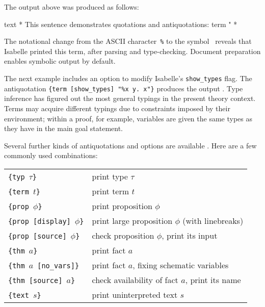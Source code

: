 \begin{isabellebody}
\begin{isamarkuptext}
  \medskip\noindent The output above was produced as follows:
  \begin{ttbox}
text {\ttlbrace}*
  This sentence demonstrates quotations and antiquotations:
  {\at}{\ttlbrace}term "%
*{\ttrbrace}
  \end{ttbox}\vspace{-\medskipamount}

  The notational change from the ASCII character~\verb,%, to the
  symbol~\isa{{\isasymlambda}} reveals that Isabelle printed this term, after
  parsing and type-checking.  Document preparation enables symbolic
  output by default.

  \medskip The next example includes an option to modify Isabelle's
  \verb,show_types, flag.  The antiquotation
  \texttt{{\at}}\verb,{term [show_types] "%x y. x"}, produces the
  output .  Type inference has figured
  out the most general typings in the present theory context.  Terms
  may acquire different typings due to constraints imposed by their
  environment; within a proof, for example, variables are given the
  same types as they have in the main goal statement.

  \medskip Several further kinds of antiquotations and options are
  available \cite{isabelle-sys}.  Here are a few commonly used
  combinations:

  \medskip

  \begin{tabular}{ll}
  \texttt{\at}\verb,{typ,~$\tau$\verb,}, & print type $\tau$ \\
  \texttt{\at}\verb,{term,~$t$\verb,}, & print term $t$ \\
  \texttt{\at}\verb,{prop,~$\phi$\verb,}, & print proposition $\phi$ \\
  \texttt{\at}\verb,{prop [display],~$\phi$\verb,}, & print large proposition $\phi$ (with linebreaks) \\
  \texttt{\at}\verb,{prop [source],~$\phi$\verb,}, & check proposition $\phi$, print its input \\
  \texttt{\at}\verb,{thm,~$a$\verb,}, & print fact $a$ \\
  \texttt{\at}\verb,{thm,~$a$~\verb,[no_vars]}, & print fact $a$, fixing schematic variables \\
  \texttt{\at}\verb,{thm [source],~$a$\verb,}, & check availability of fact $a$, print its name \\
  \texttt{\at}\verb,{text,~$s$\verb,}, & print uninterpreted text $s$ \\
  \end{tabular}


\end{isamarkuptext}
\end{isabellebody}
